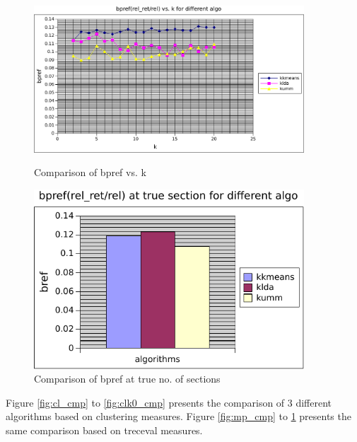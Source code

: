 \begin{figure}
\label{fig:bp_cmp}
    \centering
    \begin{minipage}{0.45\textwidth}
        \centering
        \includegraphics[width=0.9\textwidth]{fig/bpref_comp.pdf}
        \caption{Comparison of bpref vs. k}
    \end{minipage}\hfill
    \begin{minipage}{0.45\textwidth}
        \centering
        \includegraphics[width=0.9\textwidth]{fig/bpref_k0_comp.pdf}
        \caption{Comparison of bpref at true no. of sections}
    \end{minipage}
\end{figure}

Figure \ref{fig:cl_cmp} to \ref{fig:clk0_cmp} presents the comparison of 3 different algorithms based on clustering measures. Figure \ref{fig:mp_cmp} to \ref{fig:bp_cmp} presents the same comparison based on treceval measures.

